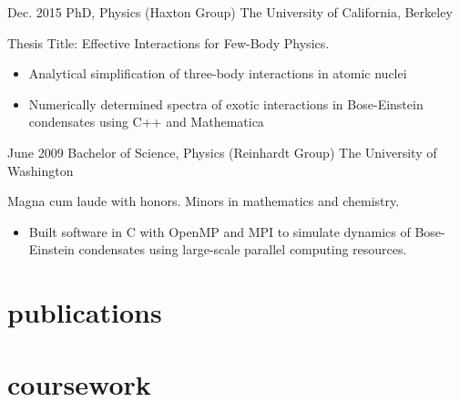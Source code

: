 \documentclass[]{friggeri-cv} %
\begin{document}
\begin{entrylist}
\entry
{Dec. 2015}
{PhD, {\normalfont  Physics (Haxton Group)}}
{The University of California, Berkeley}
{Thesis Title: Effective Interactions for Few-Body Physics. 
\begin{itemize}
\item Analytical simplification of three-body interactions in atomic nuclei 
\item Numerically determined spectra of exotic interactions in Bose-Einstein condensates using C++ and Mathematica
\end{itemize}}
\entry
{June 2009}
{Bachelor of Science, {\normalfont Physics (Reinhardt Group)}}
{The University of Washington}
{Magna cum laude with honors. Minors in mathematics and chemistry. 
\begin{itemize}
\item Built software in C with OpenMP and MPI to simulate dynamics of Bose-Einstein condensates using large-scale parallel computing resources.
\end{itemize}}
\end{entrylist}


\section{publications}




\section{coursework}
\end{document}
